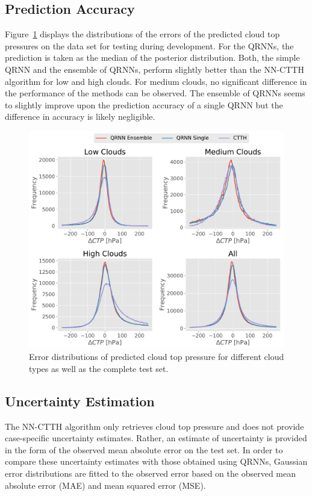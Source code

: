 \documentclass[journal abbreviation, manuscript]{copernicus}
\begin{document}
\subsection{Prediction Accuracy}


  Figure~\ref{fig:ctp_results} displays the distributions of the errors of the
  predicted cloud top pressures on the data set for testing during development.
  For the QRNNs, the prediction is taken as the median of the posterior
  distribution. Both, the simple QRNN and the ensemble of QRNNs, perform
  slightly better than the NN-CTTH algorithm for low and high clouds. For medium
  clouds, no significant difference in the performance of the methods can be
  observed. The ensemble of QRNNs seems to slightly improve upon the prediction
  accuracy of a single QRNN but the difference in accuracy is likely negligible.

  \begin{figure}[hbpt!]
    \centering
    \includegraphics[width = 0.8\linewidth]{../plots/ctp_results}
    \caption{Error distributions of predicted cloud top pressure for different cloud types as well as
    the complete test set.}
    \label{fig:ctp_results}
  \end{figure}

\subsection{Uncertainty Estimation}

The NN-CTTH algorithm only retrieves cloud top pressure and does not provide
case-specific uncertainty estimates. Rather, an estimate of uncertainty is
provided in the form of the observed mean absolute error on the test set. In
order to compare these uncertainty estimates with those obtained using QRNNs,
Gaussian error distributions are fitted to the observed error based on the
observed mean absolute error (MAE) and mean squared error (MSE).
\end{document}
